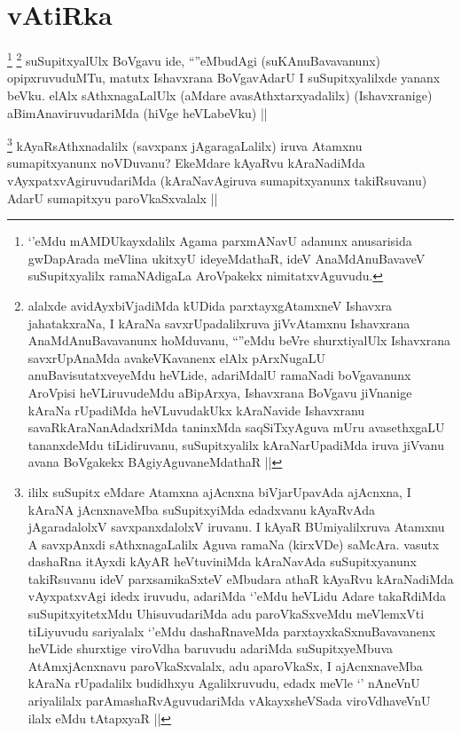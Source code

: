 \section*{vAtiRka}


\begin{artha}
\footnote{`\stext'eMdu mAMDUkayxdalilx Agama parxmANavU adanunx anusarisida gwDapArada meVlina ukitxyU ideyeMdathaR, ideV AnaMdAnuBavaveV suSupitxyalilx ramaNAdigaLa AroVpakekx nimitatxvAguvudu.}
\footnote{alalxde avidAyxbiVjadiMda kUDida parxtayxgAtamxneV Ishavxra ja{ha}takxraNa, I kAraNa savxrUpadalilxruva jiVvAtamxnu Ishavxrana AnaMdAnuBavavanunx hoMduvanu, ``\stext''eMdu beVre shurxtiyalUlx Ishavxrana savxrUpAnaMda avakeVKavanenx elAlx pArxNugaLU anuBavisutatxveyeMdu heVLide, adariMdalU ramaNadi boVgavanunx AroVpisi heVLiruvudeMdu aBipArxya, Ishavxrana BoVgavu jiVnanige kAraNa rUpadiMda heVLuvudakUkx kAraNavide Ishavxranu savaRkAraNanAdadxriMda taninxMda saqSiTxyAguva mUru avasethxgaLU tananxdeMdu tiLidiruvanu, suSupitxyalilx kAraNarUpadiMda iruva jiVvanu avana BoVgakekx BAgiyAguvaneMdathaR ||}
suSupitxyalUlx BoVgavu ide, ``\stext''eMbudAgi (suKAnuBavavanunx) opipxruvuduMTu, matutx Ishavxrana BoVgavAdarU I suSupitxyalilxde yananx beVku. elAlx sAthxnagaLalUlx (aMdare avasAthxtarxyadalilx) (Ishavxranige) aBimAnaviruvudariMda (hiVge heVLabeVku) ||
\end{artha}


\begin{artha}
\footnote{ililx suSupitx eMdare Atamxna ajAcnxna biVjarUpavAda ajAcnxna, I kAraNA jAcnxnaveMba suSupitxyiMda edadxvanu kAyaRvAda jAgaradalolxV savxpanxdalolxV iruvanu. I kAyaR BUmiyalilxruva Atamxnu A savxpAnxdi sAthxnagaLalilx Aguva ramaNa (kirxVDe) saMcAra. vasutx dashaRna itAyxdi kAyAR heVtuviniMda kAraNavAda suSupitxyanunx takiRsuvanu ideV parxsamikaSxteV eMbudara athaR kAyaRvu kAraNadiMda vAyxpatxvAgi idedx iruvudu, adariMda `\stext'eMdu heVLidu Adare takaRdiMda suSupitxyitetxMdu UhisuvudariMda adu paroVkaSxveMdu meVlemxVti tiLiyuvudu sariyalalx `\stext'eMdu dashaRnaveMda parxtayxkaSxnuBavavanenx heVLide shurxtige viroVdha baruvudu adariMda suSupitxyeMbuva AtAmxjAcnxnavu paroVkaSxvalalx, adu aparoVkaSx, I ajAcnxnaveMba kAraNa rUpadalilx budidhxyu Agalilxruvudu, edadx meVle `\stext' nAneVnU ariyalilalx parAmashaRvAguvudariMda vAkayxsheVSada viroVdhaveVnU ilalx eMdu tAtapxyaR ||}
kAyaRsAthxnadalilx (savxpanx jAgaragaLalilx) iruva Atamxnu sumapitxyanunx noVDuvanu? EkeMdare kAyaRvu kAraNadiMda vAyxpatxvAgiruvudariMda (kAraNavAgiruva sumapitxyanunx takiRsuvanu) AdarU sumapitxyu paroVkaSxvalalx ||
\end{artha}

